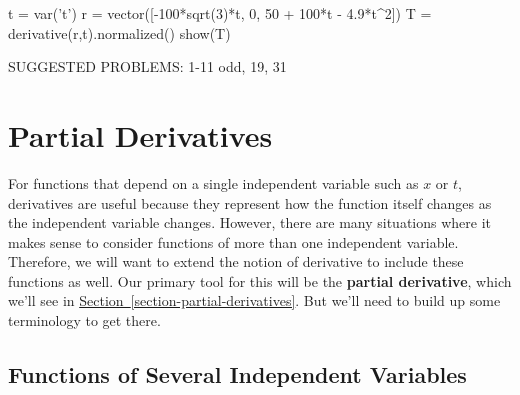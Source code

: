 \documentclass[10pt,]{book}
\newcommand{\terminology}[1]{\textbf{#1}}
\theoremstyle{ptxplainnotitle}
\theoremstyle{ptxplaintitle}
\theoremstyle{ptxplainnotitle}
\theoremstyle{ptxplaintitle}
\theoremstyle{ptxplainnotitle}
\theoremstyle{ptxplaintitle}
\theoremstyle{ptxdefinitionnotitle}
\theoremstyle{ptxdefinitiontitle}
\theoremstyle{ptxdefinitionnotitle}
\theoremstyle{ptxdefinitiontitle}
\theoremstyle{ptxdefinitionnotitle}
\theoremstyle{ptxdefinitiontitle}
\theoremstyle{ptxdefinitionnotitle}
\theoremstyle{ptxdefinitiontitle}
\theoremstyle{ptxdefinitionnotitle}
\theoremstyle{ptxdefinitiontitle}
\numberwithin{equation}{section}
\begin{document}
\begin{sageinput}
t = var('t')
r = vector([-100*sqrt(3)*t, 0, 50 + 100*t - 4.9*t^2])
T = derivative(r,t).normalized()
show(T)
\end{sageinput}
\hypertarget{p-983}{}%
SUGGESTED PROBLEMS: 1-11 odd, 19, 31%
\typeout{************************************************}
\typeout{************************************************}
\chapter[{Partial Derivatives}]{Partial Derivatives}\label{partial-derivatives}
\hypertarget{p-984}{}%
For functions that depend on a single independent variable such as \(x\) or \(t\), derivatives are useful because they represent how the function itself changes as the independent variable changes. However, there are many situations where it makes sense to consider functions of more than one independent variable. Therefore, we will want to extend the notion of derivative to include these functions as well. Our primary tool for this will be the \terminology{partial derivative}, which we'll see in \hyperref[section-partial-derivatives]{Section~\ref{section-partial-derivatives}}. But we'll need to build up some terminology to get there.%
\typeout{************************************************}
\typeout{************************************************}
\section[{Functions of Several Independent Variables}]{Functions of Several Independent Variables}\label{section-functions-of-several-independent-variables}
\typeout{************************************************}
\typeout{************************************************}
\end{document}
